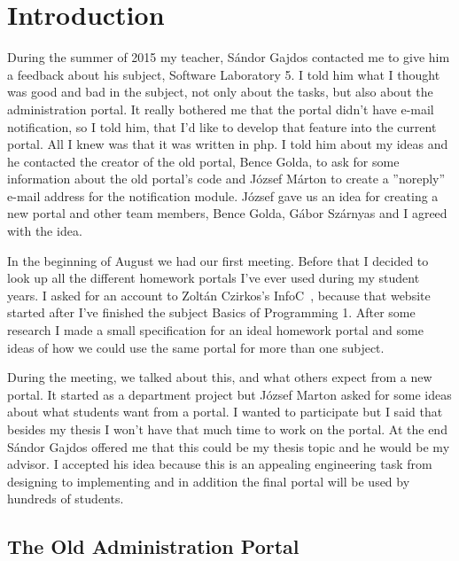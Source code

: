 \chapter{Introduction}

During the summer of 2015 my teacher, Sándor Gajdos contacted me to give him a feedback about his subject, Software Laboratory 5. I told him what I thought was good and bad in the subject, not only about the tasks, but also about the administration portal. It really bothered me that the portal didn't have e-mail notification, so I told him, that I'd like to develop that feature into the current portal. All I knew was that it was written in php. I told him about my ideas and he contacted the creator of the old portal, Bence Golda, to ask for some information about the old portal's code and József Márton to create a ''noreply'' e-mail address for the notification module. József gave us an idea for creating a new portal and other team members, Bence Golda, Gábor Szárnyas and I agreed with the idea. 

In the beginning of August we had our first meeting. Before that I decided to look up all the different homework portals I've ever used during my student years. I asked for an account to Zoltán Czirkos's InfoC~\cite{InfoC}, because that website started after I've finished the subject Basics of Programming 1. After some research I made a small specification for an ideal homework portal and some ideas of how we could use the same portal for more than one subject.

During the meeting, we talked about this, and what others expect from a new portal. It started as a department project but József Marton asked for some ideas about what students want from a portal. I wanted to participate but I said that besides my thesis I won't have that much time to work on the portal. At the end Sándor Gajdos offered me that this could be my thesis topic and he would be my advisor. I accepted his idea because this is an appealing engineering task from designing to implementing and in addition the final portal will be used by hundreds of students. 


\section{The Old Administration Portal} 

